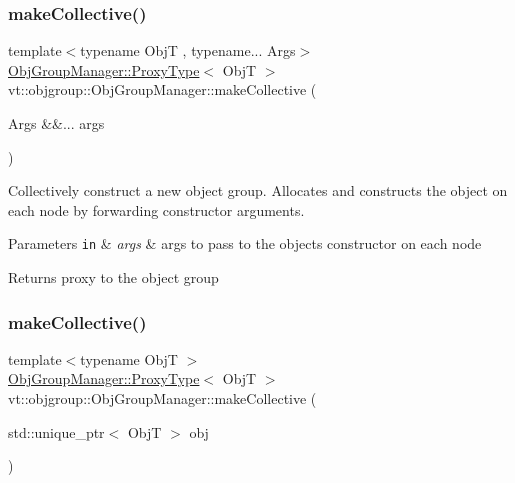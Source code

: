 \subsubsection{\texorpdfstring{make\+Collective()}{makeCollective()}\hspace{0.1cm}{\footnotesize\ttfamily [1/5]}}
{\footnotesize\ttfamily template$<$typename ObjT , typename... Args$>$ \\
\hyperlink{structvt_1_1objgroup_1_1_obj_group_manager_aea65eef52f240a52210132eef5ce591f}{Obj\+Group\+Manager\+::\+Proxy\+Type}$<$ ObjT $>$ vt\+::objgroup\+::\+Obj\+Group\+Manager\+::make\+Collective (\begin{DoxyParamCaption}\item[{Args \&\&...}]{args }\end{DoxyParamCaption})}



Collectively construct a new object group. Allocates and constructs the object on each node by forwarding constructor arguments. 


\begin{DoxyParams}[1]{Parameters}
\mbox{\tt in}  & {\em args} & args to pass to the object\textquotesingle{}s constructor on each node\\
\hline
\end{DoxyParams}
\begin{DoxyReturn}{Returns}
proxy to the object group 
\end{DoxyReturn}
\mbox{\label{structvt_1_1objgroup_1_1_obj_group_manager_ac1c2489611d2064b89b65b90059b2c4b}} 
\subsubsection{\texorpdfstring{make\+Collective()}{makeCollective()}\hspace{0.1cm}{\footnotesize\ttfamily [2/5]}}
{\footnotesize\ttfamily template$<$typename ObjT $>$ \\
\hyperlink{structvt_1_1objgroup_1_1_obj_group_manager_aea65eef52f240a52210132eef5ce591f}{Obj\+Group\+Manager\+::\+Proxy\+Type}$<$ ObjT $>$ vt\+::objgroup\+::\+Obj\+Group\+Manager\+::make\+Collective (\begin{DoxyParamCaption}\item[{std\+::unique\+\_\+ptr$<$ ObjT $>$}]{obj }\end{DoxyParamCaption})}



